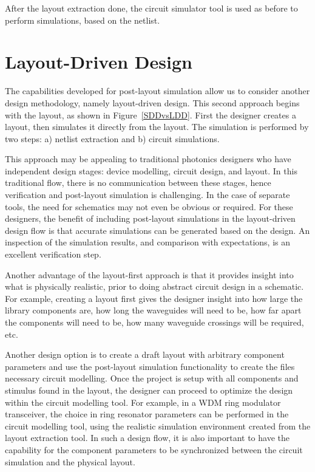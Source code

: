 \documentclass[journal]{spie}
\begin{document}
After the layout extraction done, the circuit simulator tool is used as before to perform simulations, based on the netlist.

\section{Layout-Driven Design}

The capabilities developed for post-layout simulation allow us to consider another design methodology, namely layout-driven design.   This second approach begins with the layout, as shown in Figure~\ref{SDDvsLDD}.  First the designer creates a layout, then simulates it directly from the layout.  The simulation is performed by two steps: a) netlist extraction and b) circuit simulations.  

This approach may be appealing to traditional photonics designers who have independent design stages: device modelling, circuit design, and layout.  In this traditional flow, there is no communication between these stages, hence verification and post-layout simulation is challenging.  In the case of separate tools, the need for schematics may not even be obvious or required.  For these designers, the benefit of including post-layout simulations in the layout-driven design flow is that accurate simulations can be generated based on the design.  An inspection of the simulation results, and comparison with expectations, is an excellent verification step.

Another advantage of the layout-first approach is that it provides insight into what is physically realistic, prior to doing abstract circuit design in a schematic.  For example, creating a layout first gives the designer insight into how large the library components are, how long the waveguides will need to be, how far apart the components will need to be, how many waveguide crossings will be required, etc.  

Another design option is to create a draft layout with arbitrary component parameters and use the post-layout simulation functionality to create the files necessary circuit modelling.  Once the project is setup with all components and stimulus found in the layout, the designer can proceed to optimize the design within the circuit modelling tool.  For example, in a WDM ring modulator transceiver, the choice in ring resonator parameters can be performed in the circuit modelling tool, using the realistic simulation environment created from the layout extraction tool.  In such a design flow, it is also important to have the capability for the component parameters to be synchronized between the circuit simulation and the physical layout.
\end{document}
